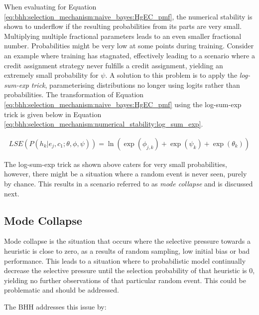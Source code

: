 When evaluating for Equation \ref{eq:bhh:selection_mechanism:naive_bayes:HgEC_pmf}, the numerical stability is shown to underflow if the resulting probabilities from its parts are very small. Multiplying multiple fractional parameters leads to an even smaller fractional number. Probabilities might be very low at some points during training. Consider an example where training has stagnated, effectively leading to a scenario where a credit assignment strategy never fulfills a credit assignment, yielding an extremely small probability for $\psi$. A solution to this problem is to apply the \textit{log-sum-exp trick}, parameterising distributions no longer using logits rather than probabilities. The transformation of Equation \ref{eq:bhh:selection_mechanism:naive_bayes:HgEC_pmf} using the log-sum-exp trick is given below in Equation \ref{eq:bhh:selection_mechanism:numerical_stability:log_sum_exp}.

\begin{equation}
    \label{eq:bhh:selection_mechanism:numerical_stability:log_sum_exp}
    \begin{split}
        LSE(P(h_{k} \vert e_{j}, c_{1};  \theta, \phi, \psi)) = \ln(\exp(\phi_{j,k}) +  \exp(\psi_{k}) + \exp(\theta_{k}))
    \end{split}
\end{equation}

The log-sum-exp trick as shown above caters for very small probabilities, however, there might be a situation where  a random event is never seen, purely by chance. This results in a scenario referred to as \textit{mode collapse} and is discussed next.

\subsection{Mode Collapse}
\label{sec:bhh:selection_mechanism:mode_collapse}

Mode collapse is the situation that occurs where the selective pressure towards a heuristic is close to zero, as a results of random sampling, low initial bias or bad performance. This leads to a situation where to probabilistic model continually decrease the selective pressure until the selection probability of that heuristic is 0, yielding no further observations of that particular random event. This could be problematic and should be addressed.

The \ac{BHH} addresses this issue by:

